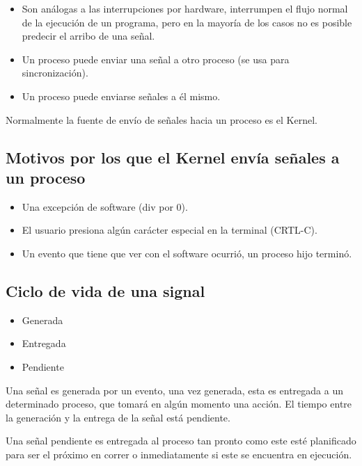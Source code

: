 \documentclass{article}
\begin{document}
\begin{itemize}
\item
  Son análogas a las interrupciones por hardware, interrumpen el flujo
  normal de la ejecución de un programa, pero en la mayoría de los casos
  no es posible predecir el arribo de una señal.
\item
  Un proceso puede enviar una señal a otro proceso (se usa para
  sincronización).
\item
  Un proceso puede enviarse señales a él mismo.
\end{itemize}

Normalmente la fuente de envío de señales hacia un proceso es el Kernel.

\subsection{Motivos por los que el Kernel envía señales a un
proceso}\label{motivos-por-los-que-el-kernel-envuxeda-seuxf1ales-a-un-proceso}

\begin{itemize}
\item
  Una excepción de software (div por 0).
\item
  El usuario presiona algún carácter especial en la terminal (CRTL-C).
\item
  Un evento que tiene que ver con el software ocurrió, un proceso hijo
  terminó.
\end{itemize}

\subsection{Ciclo de vida de una
signal}\label{ciclo-de-vida-de-una-signal}

\begin{itemize}
\item
  Generada
\item
  Entregada
\item
  Pendiente
\end{itemize}

Una señal es generada por un evento, una vez generada, esta es entregada
a un determinado proceso, que tomará en algún momento una acción. El
tiempo entre la generación y la entrega de la señal está pendiente.

Una señal pendiente es entregada al proceso tan pronto como este esté
planificado para ser el próximo en correr o inmediatamente si este se
encuentra en ejecución.
\end{document}
